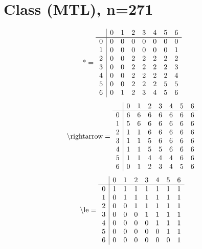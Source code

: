 \documentclass[11pt]{article}
\begin{document}
\section{Class (MTL), n=271}
\[\text{*} = 
\begin{array}{r | r r r r r r r}
 & 0 & 1 & 2 & 3 & 4 & 5 & 6 \\ \hline
0 & 0 & 0 & 0 & 0 & 0 & 0 & 0 \\
1 & 0 & 0 & 0 & 0 & 0 & 0 & 1 \\
2 & 0 & 0 & 2 & 2 & 2 & 2 & 2 \\
3 & 0 & 0 & 2 & 2 & 2 & 2 & 3 \\
4 & 0 & 0 & 2 & 2 & 2 & 2 & 4 \\
5 & 0 & 0 & 2 & 2 & 2 & 5 & 5 \\
6 & 0 & 1 & 2 & 3 & 4 & 5 & 6 \\
\end{array}
\]
\[\text{\textbackslash rightarrow} = 
\begin{array}{r | r r r r r r r}
 & 0 & 1 & 2 & 3 & 4 & 5 & 6 \\ \hline
0 & 6 & 6 & 6 & 6 & 6 & 6 & 6 \\
1 & 5 & 6 & 6 & 6 & 6 & 6 & 6 \\
2 & 1 & 1 & 6 & 6 & 6 & 6 & 6 \\
3 & 1 & 1 & 5 & 6 & 6 & 6 & 6 \\
4 & 1 & 1 & 5 & 5 & 6 & 6 & 6 \\
5 & 1 & 1 & 4 & 4 & 4 & 6 & 6 \\
6 & 0 & 1 & 2 & 3 & 4 & 5 & 6 \\
\end{array}
\]
\[\text{\textbackslash le} = 
\begin{array}{r | r r r r r r r}
 & 0 & 1 & 2 & 3 & 4 & 5 & 6 \\ \hline
0 & 1 & 1 & 1 & 1 & 1 & 1 & 1 \\
1 & 0 & 1 & 1 & 1 & 1 & 1 & 1 \\
2 & 0 & 0 & 1 & 1 & 1 & 1 & 1 \\
3 & 0 & 0 & 0 & 1 & 1 & 1 & 1 \\
4 & 0 & 0 & 0 & 0 & 1 & 1 & 1 \\
5 & 0 & 0 & 0 & 0 & 0 & 1 & 1 \\
6 & 0 & 0 & 0 & 0 & 0 & 0 & 1 \\
\end{array}
\]
\end{document}
